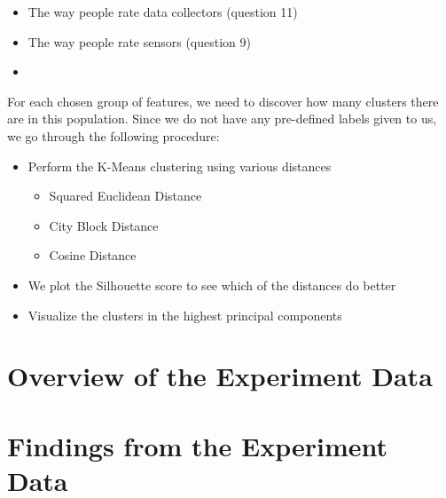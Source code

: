 \begin{itemize}
\item The way people rate data collectors (question 11)
\item The way people rate sensors (question 9)
\item 
\end{itemize}

For each chosen group of features, we need to discover how many clusters there are
in this population. Since we do not have any pre-defined labels given to us, we go through the following procedure:

\begin{itemize}
\item Perform the K-Means clustering using various distances
\begin{itemize}
\item Squared Euclidean Distance
\item City Block Distance
\item Cosine Distance
\end{itemize}
\item We plot the Silhouette score to see which of the distances do better
\item Visualize the clusters in the highest principal components
\end{itemize}


\section{Overview of the Experiment Data}

\section{Findings from the Experiment Data}



